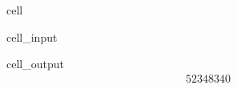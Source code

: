 \documentclass[letterpaper,10pt,english]{jupyterBook}
\begin{document}
\begin{sphinxuseclass}{cell}\begin{sphinxVerbatimInput}

\begin{sphinxuseclass}{cell_input}
\begin{sphinxVerbatim}[commandchars=\\\{\}]
\PYG{p}{[}\PYG{p}{]}
\end{sphinxVerbatim}

\end{sphinxuseclass}\end{sphinxVerbatimInput}
\begin{sphinxVerbatimOutput}

\begin{sphinxuseclass}{cell_output}\begin{equation*}
\begin{split}52348340\end{split}
\end{equation*}
\end{sphinxuseclass}\end{sphinxVerbatimOutput}

\end{sphinxuseclass}
\end{document}

